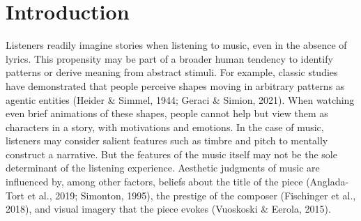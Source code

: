 \documentclass[12pt,twoside]{reedthesis}
\begin{document}
	

  \mainmatter %
  \pagestyle{fancyplain} %


    \chapter*{Introduction}

\onehalfspacing

Listeners readily imagine stories when listening to music, even in the absence of lyrics. This propensity may be part of a broader human tendency to identify patterns or derive meaning from abstract stimuli. For example, classic studies have demonstrated that people perceive shapes moving in arbitrary patterns as agentic entities (Heider \& Simmel, 1944; Geraci \& Simion, 2021). When watching even brief animations of these shapes, people cannot help but view them as characters in a story, with motivations and emotions. In the case of music, listeners may consider salient features such as timbre and pitch to mentally construct a narrative. But the features of the music itself may not be the sole determinant of the listening experience. Aesthetic judgments of music are influenced by, among other factors, beliefs about the title of the piece (Anglada-Tort et al., 2019; Simonton, 1995), the prestige of the composer (Fischinger et al., 2018), and visual imagery that the piece evokes (Vuoskoski \& Eerola, 2015). 
\end{document}
